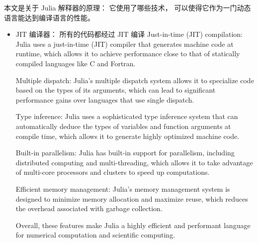
\begin{issues}
\issueDraft
\end{issues}

本文是关于 Julia 解释器的原理： 它使用了哪些技术， 可以使得它作为一门动态语言能达到编译语言的性能。

\begin{itemize}
\item JIT 编译器： 所有的代码都经过 JIT 编译
Just-in-time (JIT) compilation: Julia uses a just-in-time (JIT) compiler that generates machine code at runtime, which allows it to achieve performance close to that of statically compiled languages like C and Fortran.

Multiple dispatch: Julia's multiple dispatch system allows it to specialize code based on the types of its arguments, which can lead to significant performance gains over languages that use single dispatch.

Type inference: Julia uses a sophisticated type inference system that can automatically deduce the types of variables and function arguments at compile time, which allows it to generate highly optimized machine code.

Built-in parallelism: Julia has built-in support for parallelism, including distributed computing and multi-threading, which allows it to take advantage of multi-core processors and clusters to speed up computations.

Efficient memory management: Julia's memory management system is designed to minimize memory allocation and maximize reuse, which reduces the overhead associated with garbage collection.

Overall, these features make Julia a highly efficient and performant language for numerical computation and scientific computing.
\end{itemize}


